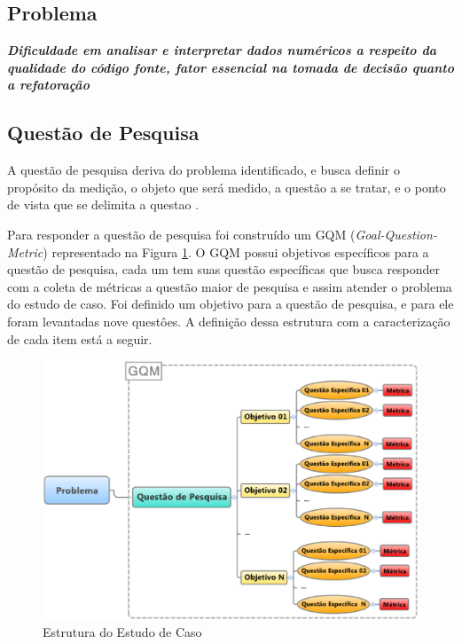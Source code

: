 \subsection{Problema}

\textit{\textbf{Dificuldade em analisar e interpretar dados numéricos a respeito da qualidade do código fonte, fator essencial na tomada de decisão quanto a refatoração}}



\subsection{Questão de Pesquisa}
A questão de pesquisa deriva do problema identificado, e busca definir o propósito da medição, o objeto que será medido, a questão a se tratar, e o ponto de vista que se delimita a questao \cite{Basili96b}.

Para responder a questão de pesquisa foi construído um GQM (\textit{Goal-Question-Metric}) \cite{Basili96b} representado na Figura \ref{fig:estrut-est-caso}. O GQM possui objetivos específicos para a questão de pesquisa, cada um tem suas questão específicas que busca responder com a coleta de métricas a questão maior de pesquisa e assim atender o problema do estudo de caso. Foi definido um objetivo para a questão de pesquisa, e para ele foram levantadas nove questôes. A definição dessa estrutura com a caracterização de cada item está a seguir.


\begin{figure}[h!]
\centering
\includegraphics[keepaspectratio=false,scale=0.53]{figuras/figuras_pedro/estrut-estudo-caso.eps}
\caption{Estrutura do Estudo de Caso}
\label{fig:estrut-est-caso}
\end{figure}
\FloatBarrier

